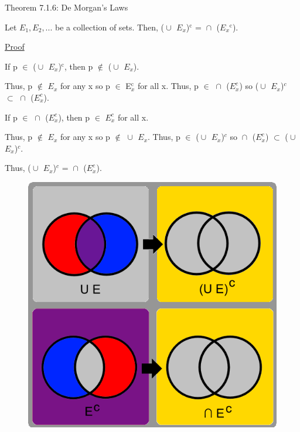 { \color{red} Theorem 7.1.6: De Morgan's Laws } 
	
	\begin{adjustbox}{minipage=14cm, right, vspace=0.1cm 0cm}
		Let $E_1, E_2 , ... $ be a collection of sets. Then,
		($\cup_{}^{}$ $E_x$)$^\text{c}$ = $\cap_{}^{}$ ($E_x$$^\text{c}$).
	\end{adjustbox}

{ \color{magenta} \underline{Proof} } 
	
	If p $\in$ ($\cup_{}^{}$ $E_x$)$^\text{c}$, then p $\not \in$ ($\cup_{}^{}$ $E_x$).

	Thus, p $\not \in$ $E_x$ for any x so p $\in$ E$_x^\text{c}$ for all x.
	Thus, p $\in$ $\cap_{}^{}$ ($E_x^c$) so
	($\cup_{}^{}$ $E_x$)$^c$ $\subset$ $\cap_{}^{}$ ($E_x^c$).

	If p $\in$ $\cap_{}^{}$ ($E_x^c$), then p $\in$ $E_x^c$ for all x.
	
	Thus, p $\not \in$ $E_x$ for any x so p $\not \in$ $\cup_{}^{}$ $E_x$.
	Thus, p $\in$ ($\cup_{}^{}$ $E_x$)$^c$ so
	$\cap_{}^{}$ ($E_x^c$) $\subset$ ($\cup_{}^{}$ $E_x$)$^c$.

	Thus, ($\cup_{}^{}$ $E_x$)$^c$ = $\cap_{}^{}$ ($E_x^c$). \\

\begin{figure}[h]
	\centering
	\includegraphics[scale=0.35]{Images/7.1.6.png}
\end{figure}

